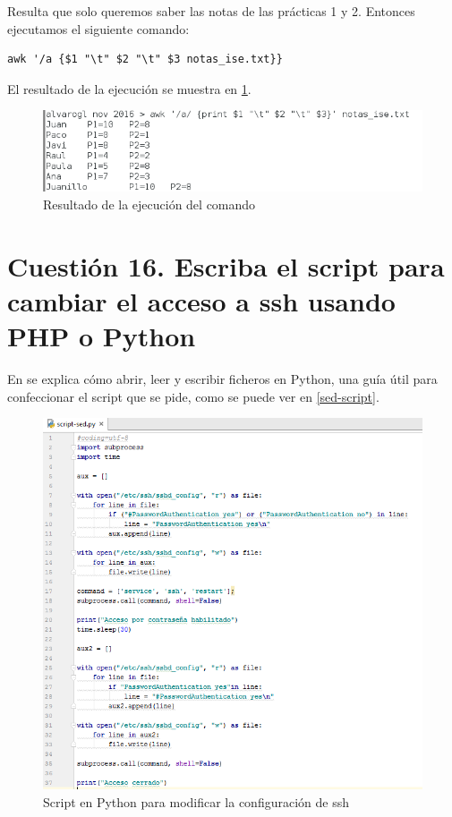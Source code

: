 Resulta que solo queremos saber las notas de las prácticas 1 y 2. Entonces ejecutamos el siguiente comando:

\begin{verbatim}
awk '/a {$1 "\t" $2 "\t" $3 notas_ise.txt}}
\end{verbatim}

El resultado de la ejecución se muestra en \ref{notas-ise-final}.

\begin{figure}[H]
	\centering
	\includegraphics[scale=0.6]{notas-ise-final.png}
	\caption{Resultado de la ejecución del comando} \label{notas-ise-final}
\end{figure}

\section{Cuestión 16. Escriba el script para cambiar el acceso a ssh usando PHP o Python}

En \cite{python} se explica cómo abrir, leer y escribir ficheros en Python, una guía útil para confeccionar el script que se pide, como se puede ver en \ref{sed-script}.

\begin{figure}[H]
	\centering
	\includegraphics[scale=0.6]{sed-scriptpy.png}
	\caption{Script en Python para modificar la configuración de ssh} \label{sed-scriptpy}
\end{figure}


